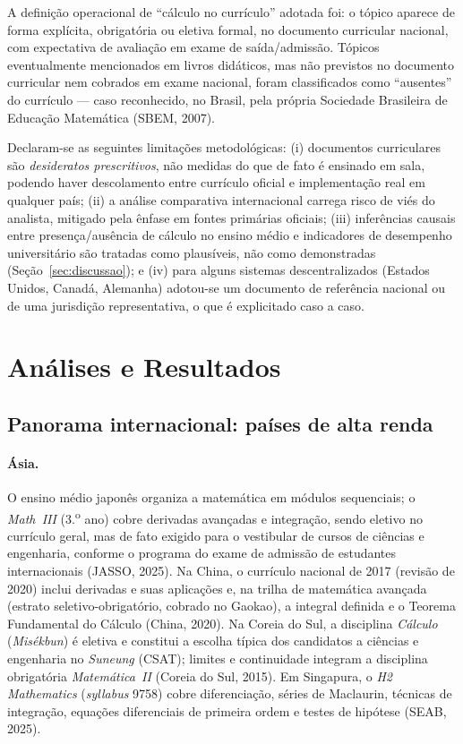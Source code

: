 \documentclass[12pt,a4paper,oneside]{article}
\begin{document}
A definição operacional de ``cálculo no currículo'' adotada foi: o tópico
aparece de forma explícita, obrigatória ou eletiva formal, no documento
curricular nacional, com expectativa de avaliação em exame de
saída/admissão. Tópicos eventualmente mencionados em livros didáticos,
mas não previstos no documento curricular nem cobrados em exame nacional,
foram classificados como ``ausentes'' do currículo --- caso reconhecido,
no Brasil, pela própria Sociedade Brasileira de Educação Matemática
(SBEM, 2007).

Declaram-se as seguintes limitações metodológicas: (i) documentos
curriculares são \emph{desideratos prescritivos}, não medidas do que de
fato é ensinado em sala, podendo haver descolamento entre currículo
oficial e implementação real em qualquer país; (ii) a análise comparativa
internacional carrega risco de viés do analista, mitigado pela ênfase em
fontes primárias oficiais; (iii) inferências causais entre
presença/ausência de cálculo no ensino médio e indicadores de desempenho
universitário são tratadas como plausíveis, não como demonstradas
(Seção~\ref{sec:discussao}); e (iv) para alguns sistemas
descentralizados (Estados Unidos, Canadá, Alemanha) adotou-se um
documento de referência nacional ou de uma jurisdição representativa, o
que é explicitado caso a caso.

\section{Análises e Resultados}

\subsection{Panorama internacional: países de alta renda}

\paragraph{Ásia.} O ensino médio japonês organiza a matemática em módulos
sequenciais; o \emph{Math~III} (3.\textsuperscript{o} ano) cobre
derivadas avançadas e integração, sendo eletivo no currículo geral, mas
de fato exigido para o vestibular de cursos de ciências e engenharia,
conforme o programa do exame de admissão de estudantes internacionais
(JASSO, 2025). Na China, o currículo nacional de 2017 (revisão de 2020)
inclui derivadas e suas aplicações e, na trilha de matemática avançada
(estrato seletivo-obrigatório, cobrado no Gaokao), a integral definida e
o Teorema Fundamental do Cálculo (China, 2020). Na Coreia do Sul, a
disciplina \emph{Cálculo} (\emph{Misékbun}) é eletiva e constitui a
escolha típica dos candidatos a ciências e engenharia no \emph{Suneung}
(CSAT); limites e continuidade integram a disciplina obrigatória
\emph{Matemática~II} (Coreia do Sul, 2015). Em Singapura, o \emph{H2
Mathematics} (\emph{syllabus} 9758) cobre diferenciação, séries de
Maclaurin, técnicas de integração, equações diferenciais de primeira
ordem e testes de hipótese (SEAB, 2025).
\end{document}
